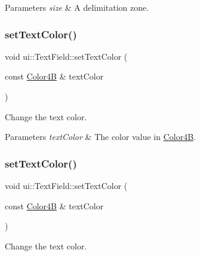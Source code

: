 \begin{DoxyParams}{Parameters}
{\em size} & A delimitation zone. \\
\hline
\end{DoxyParams}
\mbox{\label{classui_1_1TextField_a9eb575bdd0cfb182d591b90b8aab7b68}} 
\subsubsection{\texorpdfstring{set\+Text\+Color()}{setTextColor()}\hspace{0.1cm}{\footnotesize\ttfamily [1/2]}}
{\footnotesize\ttfamily void ui\+::\+Text\+Field\+::set\+Text\+Color (\begin{DoxyParamCaption}\item[{const \hyperlink{structColor4B}{Color4B} \&}]{text\+Color }\end{DoxyParamCaption})}



Change the text color. 


\begin{DoxyParams}{Parameters}
{\em text\+Color} & The color value in {\ttfamily \hyperlink{structColor4B}{Color4B}}. \\
\hline
\end{DoxyParams}
\mbox{\label{classui_1_1TextField_a9eb575bdd0cfb182d591b90b8aab7b68}} 
\subsubsection{\texorpdfstring{set\+Text\+Color()}{setTextColor()}\hspace{0.1cm}{\footnotesize\ttfamily [2/2]}}
{\footnotesize\ttfamily void ui\+::\+Text\+Field\+::set\+Text\+Color (\begin{DoxyParamCaption}\item[{const \hyperlink{structColor4B}{Color4B} \&}]{text\+Color }\end{DoxyParamCaption})}



Change the text color. 


